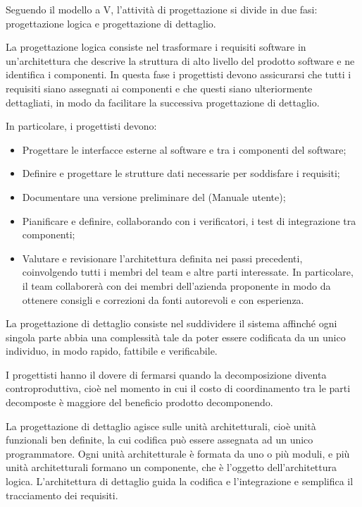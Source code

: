 \documentclass[10pt, a4paper]{article}
\begin{document}
Seguendo il modello a V, l'attività di progettazione si divide in due fasi: progettazione logica e progettazione di dettaglio.

La progettazione logica consiste nel trasformare i requisiti software in un'architettura che descrive la struttura di alto livello del prodotto software e ne identifica i componenti.
In questa fase i progettisti devono assicurarsi che tutti i requisiti siano assegnati ai componenti e che questi siano ulteriormente dettagliati, in modo da facilitare la successiva progettazione di dettaglio.

In particolare, i progettisti devono:
\begin{itemize}
    \item Progettare le interfacce esterne al software e tra i componenti del software;
    \item Definire e progettare le strutture dati necessarie per soddisfare i requisiti;
    \item Documentare una versione preliminare del (Manuale utente);
    \item Pianificare e definire, collaborando con i verificatori, i test di integrazione tra componenti;
    \item Valutare e revisionare l'architettura definita nei passi precedenti, coinvolgendo tutti i membri del team e altre parti interessate. In particolare, il team collaborerà con dei membri dell'azienda proponente in modo da ottenere consigli e correzioni da fonti autorevoli e con esperienza.
\end{itemize}

\label{sec:progettazione_di_dettaglio}
La progettazione di dettaglio consiste nel suddividere il sistema affinché ogni singola parte abbia una complessità tale da poter essere codificata da un unico individuo, in modo rapido, fattibile e verificabile.

I progettisti hanno il dovere di fermarsi quando la decomposizione diventa controproduttiva, cioè nel momento in cui il costo di coordinamento tra le parti decomposte è maggiore del beneficio prodotto decomponendo.

La progettazione di dettaglio agisce sulle unità architetturali, cioè unità funzionali ben definite, la cui codifica può essere assegnata ad un unico programmatore.
Ogni unità architetturale è formata da uno o più moduli, e più unità architetturali formano un componente, che è l'oggetto dell'architettura logica.
L'architettura di dettaglio guida la codifica e l'integrazione e semplifica il tracciamento dei requisiti.
\end{document}
